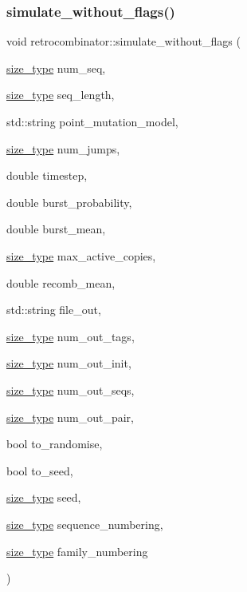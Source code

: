 \subsubsection{\texorpdfstring{simulate\+\_\+without\+\_\+flags()}{simulate\_without\_flags()}\hspace{0.1cm}{\footnotesize\ttfamily [2/2]}}
{\footnotesize\ttfamily void retrocombinator\+::simulate\+\_\+without\+\_\+flags (\begin{DoxyParamCaption}\item[{\hyperlink{namespaceretrocombinator_a8e1541b50cee66a791df4c437ccbb385}{size\+\_\+type}}]{num\+\_\+seq,  }\item[{\hyperlink{namespaceretrocombinator_a8e1541b50cee66a791df4c437ccbb385}{size\+\_\+type}}]{seq\+\_\+length,  }\item[{std\+::string}]{point\+\_\+mutation\+\_\+model,  }\item[{\hyperlink{namespaceretrocombinator_a8e1541b50cee66a791df4c437ccbb385}{size\+\_\+type}}]{num\+\_\+jumps,  }\item[{double}]{timestep,  }\item[{double}]{burst\+\_\+probability,  }\item[{double}]{burst\+\_\+mean,  }\item[{\hyperlink{namespaceretrocombinator_a8e1541b50cee66a791df4c437ccbb385}{size\+\_\+type}}]{max\+\_\+active\+\_\+copies,  }\item[{double}]{recomb\+\_\+mean,  }\item[{std\+::string}]{file\+\_\+out,  }\item[{\hyperlink{namespaceretrocombinator_a8e1541b50cee66a791df4c437ccbb385}{size\+\_\+type}}]{num\+\_\+out\+\_\+tags,  }\item[{\hyperlink{namespaceretrocombinator_a8e1541b50cee66a791df4c437ccbb385}{size\+\_\+type}}]{num\+\_\+out\+\_\+init,  }\item[{\hyperlink{namespaceretrocombinator_a8e1541b50cee66a791df4c437ccbb385}{size\+\_\+type}}]{num\+\_\+out\+\_\+seqs,  }\item[{\hyperlink{namespaceretrocombinator_a8e1541b50cee66a791df4c437ccbb385}{size\+\_\+type}}]{num\+\_\+out\+\_\+pair,  }\item[{bool}]{to\+\_\+randomise,  }\item[{bool}]{to\+\_\+seed,  }\item[{\hyperlink{namespaceretrocombinator_a8e1541b50cee66a791df4c437ccbb385}{size\+\_\+type}}]{seed,  }\item[{\hyperlink{namespaceretrocombinator_a8e1541b50cee66a791df4c437ccbb385}{size\+\_\+type}}]{sequence\+\_\+numbering,  }\item[{\hyperlink{namespaceretrocombinator_a8e1541b50cee66a791df4c437ccbb385}{size\+\_\+type}}]{family\+\_\+numbering }\end{DoxyParamCaption})}




